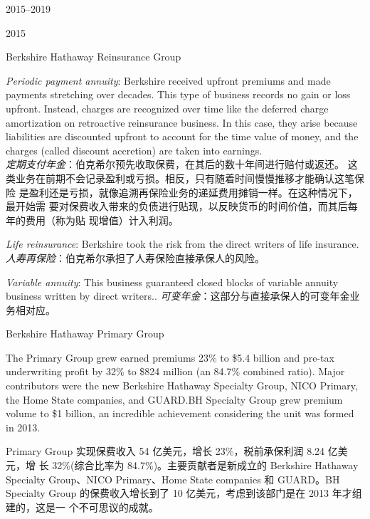 \begin{chapter}{2015--2019}
\begin{section}{2015}
\begin{subsection}{Berkshire Hathaway Reinsurance Group}
\begin{verseparallel}
  {
    \textit{Periodic payment annuity}: Berkshire received upfront premiums and
    made payments stretching over decades. This type of business records
    no gain or loss upfront. Instead, charges are recognized over time like
    the deferred charge amortization on retroactive reinsurance business.
    In this case, they arise because liabilities are discounted upfront to
    account for the time value of money, and the charges (called discount
    accretion) are taken into earnings. \\
  }
  {
    \textit{定期支付年金}：伯克希尔预先收取保费，在其后的数十年间进行赔付或返还。
    这类业务在前期不会记录盈利或亏损。相反，只有随着时间慢慢推移才能确认这笔保险
    是盈利还是亏损，就像追溯再保险业务的递延费用摊销一样。在这种情况下，最开始需
    要对保费收入带来的负债进行贴现，以反映货币的时间价值，而其后每年的费用（称为贴
    现增值）计入利润。
  }
\end{verseparallel}

\begin{verseparallel}
  {
    \textit{Life reinsurance}: Berkshire took the risk from the direct writers of
    life insurance. \\
  }
  {
    \textit{人寿再保险}：伯克希尔承担了人寿保险直接承保人的风险。
  }
\end{verseparallel}

\begin{verseparallel}
  {
    \textit{Variable annuity}: This business guaranteed closed blocks of
    variable annuity business written by direct writers..
  }
  {
    \textit{可变年金}：这部分与直接承保人的可变年金业务相对应。
  }
\end{verseparallel}

\end{subsection}

\begin{subsection}{Berkshire Hathaway Primary Group}
\begin{verseparallel}
  {

    The Primary Group grew earned premiums 23\% to \$5.4 billion and pre-tax
    underwriting profit by 32\% to \$824 million (an 84.7\% combined ratio).
    Major contributors were the new Berkshire Hathaway Specialty Group, NICO
    Primary, the Home State companies, and GUARD.\@ BH Specialty Group grew
    premium volume to \$1 billion, an incredible achievement considering the unit
    was formed in 2013.

  }
  {
    Primary Group 实现保费收入 54 亿美元，增长 23\%，税前承保利润 8.24 亿美元，增
    长 32\%(综合比率为 84.7\%)。主要贡献者是新成立的 Berkshire Hathaway
    Specialty Group、NICO Primary、Home State companies 和 GUARD。BH Specialty
    Group 的保费收入增长到了 10 亿美元，考虑到该部门是在 2013 年才组建的，这是一
    个不可思议的成就。
  }
\end{verseparallel}


\end{subsection}
\end{section}
\end{chapter}
